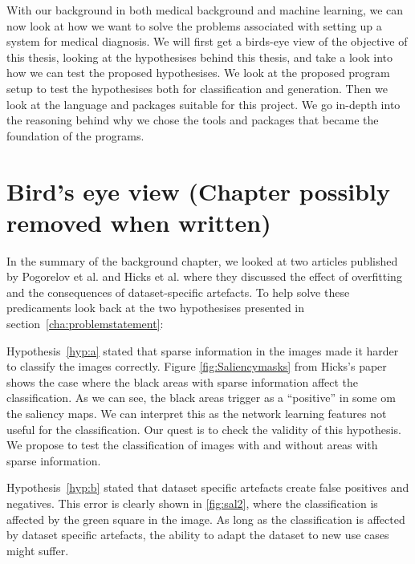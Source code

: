 With our background in both medical background and machine learning, we can now look at how we want to solve the problems associated with setting up a system for medical diagnosis.  
We will first get a birds-eye view of the objective of this thesis, looking at the hypothesises behind this thesis, and take a look into how we can test the proposed hypothesises. We look at the proposed program setup to test the hypothesises both for classification and generation.
Then we look at the language and packages suitable for this project. We go in-depth into the reasoning behind why we chose the tools and packages that became the foundation of the programs. 


\section{ Bird's eye view (Chapter possibly removed when written)}
\label{cha:BEW}
In the summary of the background chapter, we looked at two articles published by Pogorelov et al. and Hicks et al. where they discussed the effect of overfitting and the consequences of dataset-specific artefacts.
To help solve these predicaments look back at the two hypothesises presented in section~\ref{cha:problemstatement}:

\vspace{2px}
Hypothesis~\ref{hyp:a} stated that sparse information in the images made it harder to classify the images correctly. Figure \ref{fig:Saliencymasks} from Hicks's paper shows the case where the black areas with sparse information affect the classification. As we can see, the black areas trigger as a ``positive'' in some om the saliency maps. We can interpret this as the network learning features not useful for the classification. 
Our quest is to check the validity of this hypothesis. We propose to test the classification of images with and without areas with sparse information.


\vspace{5px}
Hypothesis~\ref{hyp:b} stated that dataset specific artefacts create false positives and negatives. This error is clearly shown in \ref{fig:sal2}, where the classification is affected by the green square in the image. 
As long as the classification is affected by dataset specific artefacts, the ability to adapt the dataset to new use cases might suffer.  



